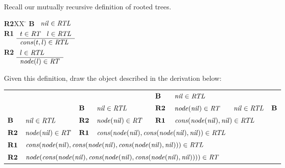\documentclass[addpoints]{exam}
\begin{document}
\begin{questions}
\question[3] 
Recall our mutually recursive definition of rooted trees.
\begin{tabbing}
{\bf R2}XX \=  \kill
{\bf B} \>
        \(\begin{array}[t]{l}
        \mbox{\it nil\/}\in\mbox{\it RTL\/}
        \end{array}\) \\[2ex]
{\bf R1} \>
        \(\begin{array}[t]{l}
        t\in\mbox{\it RT\/}\;\;\;l\in\mbox{\it RTL\/} \\
        \hline
        \mbox{\it cons\/}(t,l)\in\mbox{\it RTL\/}
        \end{array}\) \\[2ex]
{\bf R2} \>
        \(\begin{array}[t]{l}
        l\in\mbox{\it RTL\/} \\
        \hline
        \mbox{\it node\/}(l)\in\mbox{\it RT\/}
        \end{array}\)
\end{tabbing}

Given this definition, draw the object described in the derivation below: 

\begin{tabular}{llllllll}
           &                                 &            &                                 & $\mbox{\bf B}$  & $\mbox{\it nil\/}\in\mbox{\it RTL\/}$                                                                \\ \cline{6-6}
           &                                 & $\mbox{\bf B}$  & $\mbox{\it nil\/}\in\mbox{\it RTL\/}$           & $\mbox{\bf R2}$ & $\mbox{\it node\/}(\mbox{\it nil\/})\in\mbox{\it RT\/}$ & $\mbox{\it nil\/}\in\mbox{\it RTL\/}$                  & $\mbox{\bf B}$ \\ \cline{4-4} \cline{6-7}
$\mbox{\bf B}$  & $\mbox{\it nil\/}\in\mbox{\it RTL\/}$           & $\mbox{\bf R2}$ & $\mbox{\it node\/}(\mbox{\it nil\/})\in\mbox{\it RT\/}$ & $\mbox{\bf R1}$ & \multicolumn{2}{l}{$\mbox{\it cons\/}(\mbox{\it node\/}(\mbox{\it nil\/}),\mbox{\it nil\/})\in\mbox{\it RTL\/}$}             \\ \cline{2-2} \cline{4-7}
$\mbox{\bf R2}$ & $\mbox{\it node\/}(\mbox{\it nil\/})\in\mbox{\it RT\/}$ & $\mbox{\bf R1}$ & \multicolumn{3}{l}{$\mbox{\it cons\/}(\mbox{\it node\/}(\mbox{\it nil\/}), \mbox{\it cons\/}(\mbox{\it node\/}(\mbox{\it nil\/}),\mbox{\it nil\/}))\in\mbox{\it RTL\/}$}                            \\ \cline{2-6}
$\mbox{\bf R1}$ & \multicolumn{5}{l}{$\mbox{\it cons\/}(\mbox{\it node\/}(\mbox{\it nil\/}), \mbox{\it cons\/}(\mbox{\it node\/}(\mbox{\it nil\/}), \mbox{\it cons\/}(\mbox{\it node\/}(\mbox{\it nil\/}),\mbox{\it nil\/}))) \in \mbox{\it RTL\/}$}                                         \\ \cline{2-6}
$\mbox{\bf R2}$ & \multicolumn{5}{l}{$\mbox{\it node\/}(\mbox{\it cons\/}(\mbox{\it node\/}(\mbox{\it nil\/}), \mbox{\it cons\/}(\mbox{\it node\/}(\mbox{\it nil\/}), \mbox{\it cons\/}(\mbox{\it node\/}(\mbox{\it nil\/}),\mbox{\it nil\/}))))\in\mbox{\it RT\/}$}                      
\end{tabular}


\end{questions}
\end{document}
